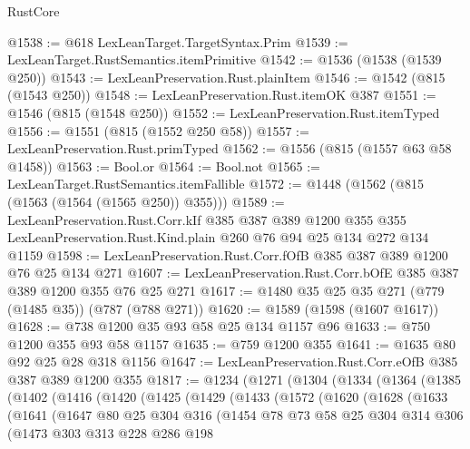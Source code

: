 \begin{lexlean}{RustCore}
\begin{coremodule}
@1538 := @618 LexLeanTarget.TargetSyntax.Prim
@1539 := LexLeanTarget.RustSemantics.itemPrimitive
@1542 := @1536 (@1538 (@1539 @250))
@1543 := LexLeanPreservation.Rust.plainItem
@1546 := @1542 (@815 (@1543 @250))
@1548 := LexLeanPreservation.Rust.itemOK @387
@1551 := @1546 (@815 (@1548 @250))
@1552 := LexLeanPreservation.Rust.itemTyped
@1556 := @1551 (@815 (@1552 @250 @58))
@1557 := LexLeanPreservation.Rust.primTyped
@1562 := @1556 (@815 (@1557 @63 @58 @1458))
@1563 := Bool.or
@1564 := Bool.not
@1565 := LexLeanTarget.RustSemantics.itemFallible
@1572 := @1448 (@1562 (@815 (@1563 (@1564 (@1565 @250)) @355)))
@1589 := LexLeanPreservation.Rust.Corr.kIf
    @385
    @387
    @389
    @1200
    @355
    @355
    LexLeanPreservation.Rust.Kind.plain
    @260
    @76
    @94
    @25
    @134
    @272
    @134
    @1159
@1598 := LexLeanPreservation.Rust.Corr.fOfB @385 @387 @389 @1200 @76 @25 @134 @271
@1607 := LexLeanPreservation.Rust.Corr.bOfE @385 @387 @389 @1200 @355 @76 @25 @271
@1617 := @1480 @35 @25 @35 @271 (@779 (@1485 @35)) (@787 (@788 @271))
@1620 := @1589 (@1598 (@1607 @1617))
@1628 := @738 @1200 @35 @93 @58 @25 @134 @1157 @96
@1633 := @750 @1200 @355 @93 @58 @1157
@1635 := @759 @1200 @355
@1641 := @1635 @80 @92 @25 @28 @318 @1156
@1647 := LexLeanPreservation.Rust.Corr.eOfB @385 @387 @389 @1200 @355
@1817 := @1234
    (@1271
      (@1304
        (@1334
          (@1364
            (@1385
              (@1402
                (@1416
                  (@1420
                    (@1425
                      (@1429
                        (@1433
                          (@1572
                            (@1620
                              (@1628
                                (@1633
                                  (@1641
                                    (@1647
                                      @80
                                      @25
                                      @304
                                      @316
                                      (@1454
                                        @78
                                        @73
                                        @58
                                        @25
                                        @304
                                        @314
                                        @306
                                        (@1473
                                          @303
                                          @313
                                          @228
                                          @286
                                          @198

\end{coremodule}
\end{lexlean}
